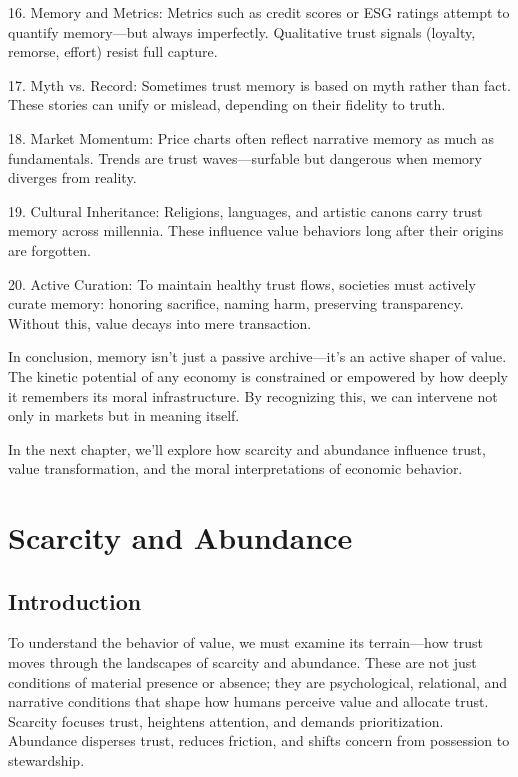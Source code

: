 \documentclass[11pt,oneside]{book}
\begin{document}
16. Memory and Metrics: Metrics such as credit scores or ESG ratings attempt to quantify memory—but always imperfectly. Qualitative trust signals (loyalty, remorse, effort) resist full capture.



17. Myth vs. Record: Sometimes trust memory is based on myth rather than fact. These stories can unify or mislead, depending on their fidelity to truth.



18. Market Momentum: Price charts often reflect narrative memory as much as fundamentals. Trends are trust waves—surfable but dangerous when memory diverges from reality.



19. Cultural Inheritance: Religions, languages, and artistic canons carry trust memory across millennia. These influence value behaviors long after their origins are forgotten.



20. Active Curation: To maintain healthy trust flows, societies must actively curate memory: honoring sacrifice, naming harm, preserving transparency. Without this, value decays into mere transaction.


In conclusion, memory isn’t just a passive archive—it’s an active shaper of value. The kinetic potential of any economy is constrained or empowered by how deeply it remembers its moral infrastructure. By recognizing this, we can intervene not only in markets but in meaning itself.

In the next chapter, we’ll explore how scarcity and abundance influence trust, value transformation, and the moral interpretations of economic behavior.


\chapter{ Scarcity and Abundance}

\section{Introduction}

To understand the behavior of value, we must examine its terrain—how trust moves through the landscapes of scarcity and abundance. These are not just conditions of material presence or absence; they are psychological, relational, and narrative conditions that shape how humans perceive value and allocate trust. Scarcity focuses trust, heightens attention, and demands prioritization. Abundance disperses trust, reduces friction, and shifts concern from possession to stewardship.
\end{document}
